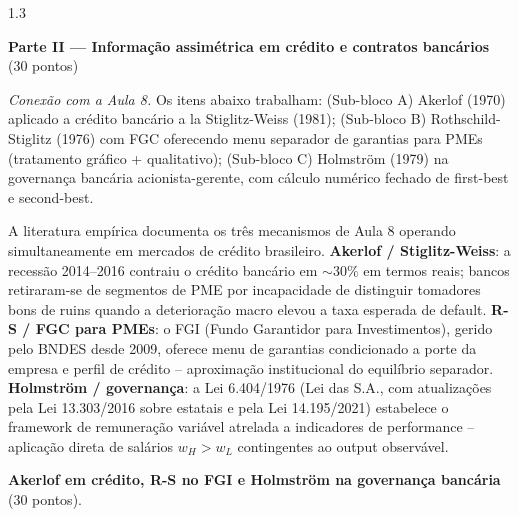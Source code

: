 \documentclass[11pt,addpoints]{exam}
\begin{document}
\begin{spacing}{1.3}
\begin{questions}
\end{questions}

\newpage

\begin{center}\large\textbf{Parte II --- Informação assimétrica em crédito e contratos bancários} \quad (30 pontos)\end{center}

\textit{Conexão com a Aula 8.} Os itens abaixo trabalham: (Sub-bloco A) Akerlof (1970) aplicado a crédito bancário a la Stiglitz-Weiss (1981); (Sub-bloco B) Rothschild-Stiglitz (1976) com FGC oferecendo menu separador de garantias para PMEs (tratamento gráfico + qualitativo); (Sub-bloco C) Holmström (1979) na governança bancária acionista-gerente, com cálculo numérico fechado de first-best e second-best.

\begin{contextbox}
\small
A literatura empírica documenta os três mecanismos de Aula 8 operando simultaneamente em mercados de crédito brasileiro. \textbf{Akerlof / Stiglitz-Weiss}: a recessão 2014--2016 contraiu o crédito bancário em $\sim 30\%$ em termos reais; bancos retiraram-se de segmentos de PME por incapacidade de distinguir tomadores bons de ruins quando a deterioração macro elevou a taxa esperada de default. \textbf{R-S / FGC para PMEs}: o FGI (Fundo Garantidor para Investimentos), gerido pelo BNDES desde 2009, oferece menu de garantias condicionado a porte da empresa e perfil de crédito -- aproximação institucional do equilíbrio separador. \textbf{Holmström / governança}: a Lei 6.404/1976 (Lei das S.A., com atualizações pela Lei 13.303/2016 sobre estatais e pela Lei 14.195/2021) estabelece o framework de remuneração variável atrelada a indicadores de performance -- aplicação direta de salários $w_H > w_L$ contingentes ao output observável.
\end{contextbox}

\begin{questions}
\setcounter{question}{1}
\question \textbf{Akerlof em crédito, R-S no FGI e Holmström na governança bancária} (30 pontos).


\end{questions}
\end{spacing}
\end{document}
